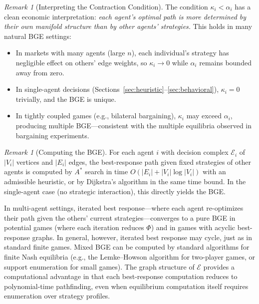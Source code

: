 \documentclass[12pt]{article}
\theoremstyle{definition}
\theoremstyle{remark}
\newtheorem{remark}[theorem]{Remark}
\newcommand{\E}{\mathcal{E}}               %
\begin{document}
\begin{remark}[Interpreting the Contraction Condition]
The condition $\kappa_i < \alpha_i$ has a clean economic interpretation: \emph{each agent's optimal path is more determined by their own manifold structure than by other agents' strategies.}  This holds in many natural BGE settings:
\begin{itemize}
    \item In markets with many agents (large $n$), each individual's strategy has negligible effect on others' edge weights, so $\kappa_i \to 0$ while $\alpha_i$ remains bounded away from zero.
    \item In single-agent decisions (Sections~\ref{sec:heuristic}--\ref{sec:behavioral}), $\kappa_i = 0$ trivially, and the BGE is unique.
    \item In tightly coupled games (e.g., bilateral bargaining), $\kappa_i$ may exceed $\alpha_i$, producing multiple BGE---consistent with the multiple equilibria observed in bargaining experiments.
\end{itemize}
\end{remark}

\begin{remark}[Computing the BGE]
For each agent $i$ with decision complex $\E_i$ of $|V_i|$ vertices and $|E_i|$ edges, the best-response path given fixed strategies of other agents is computed by $A^*$ search in time $O(|E_i| + |V_i| \log |V_i|)$ with an admissible heuristic, or by Dijkstra's algorithm in the same time bound.  In the single-agent case (no strategic interaction), this directly yields the BGE.

In multi-agent settings, iterated best response---where each agent re-optimizes their path given the others' current strategies---converges to a pure BGE in potential games (where each iteration reduces $\Phi$) and in games with acyclic best-response graphs.  In general, however, iterated best response may cycle, just as in standard finite games.  Mixed BGE can be computed by standard algorithms for finite Nash equilibria (e.g., the Lemke--Howson algorithm for two-player games, or support enumeration for small games).  The graph structure of $\E$ provides a computational advantage in that each best-response computation reduces to polynomial-time pathfinding, even when equilibrium computation itself requires enumeration over strategy profiles.
\end{remark}
\end{document}
